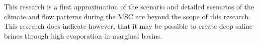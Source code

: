 \documentclass[twocolumn]{article}
\begin{document}
This research is a first approximation of the scenario and detailed scenarios of the climate and flow patterns during the MSC are beyond the scope of this research. This research does indicate however, that it may be possible to create deep saline brines through high evaporation in marginal basins.














\end{document}

